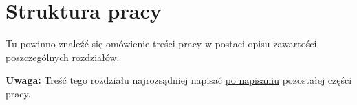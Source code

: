 \section{Struktura pracy}

Tu powinno znaleźć się omówienie treści pracy w postaci opisu zawartości poszczególnych rozdziałów.

\textbf{Uwaga:} Treść tego rozdziału najrozsądniej napisać \underline{po napisaniu} pozostałej części pracy.

